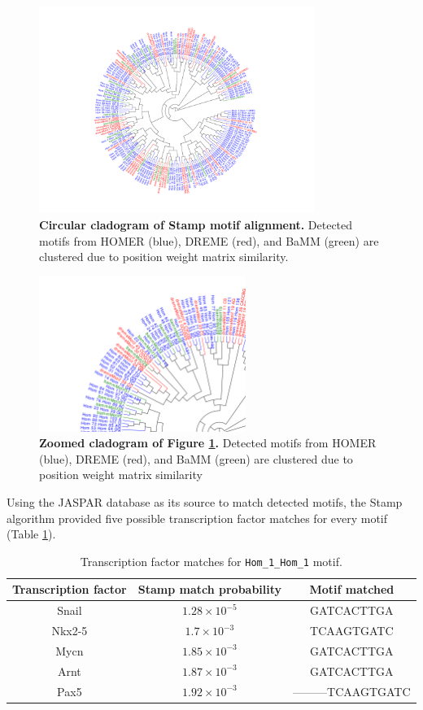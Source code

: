 \documentclass[12pt]{article}
\begin{document}
\begin{figure}[!htbp]
\centering
\includegraphics[width= 0.8\textwidth]{stampTree.pdf} 
\caption{{\bf Circular cladogram of Stamp motif alignment.} Detected motifs from HOMER (blue),  DREME (red), and BaMM (green) are clustered due to position weight matrix similarity. }
\label{mainStampTree}
\end{figure}

\begin{figure}[!htbp]
\centering
\includegraphics[width= 0.6\textwidth]{stampTreeDetail.pdf} 
\caption{{\bf Zoomed cladogram of Figure \ref{mainStampTree}.} Detected motifs from HOMER (blue),  DREME (red), and BaMM (green) are clustered due to position weight matrix similarity}
\label{treeDetail}
\end{figure}

Using the JASPAR database  \citep{Mathelier2016} as its source to match detected motifs, the Stamp algorithm provided five possible transcription factor matches for every motif (Table \ref{5tfs}). 

\begin{table}[!htbp]
\caption{Transcription factor matches for \texttt{Hom\_1\_Hom\_1} motif.}
\label{5tfs}
\centering
\begin{tabular}{ccc}
\toprule[0.2em]
Transcription factor & Stamp match probability & Motif matched \\
\midrule[0.1em]
Snail & $1.28\times10^{-5}$ & GATCACTTGA\\
Nkx2-5 & $1.7\times10^{-3}$ & TCAAGTGATC\\
Mycn & $1.85\times10^{-3}$ & GATCACTTGA\\
Arnt & $1.87\times10^{-3}$ & GATCACTTGA\\
Pax5 & $1.92\times10^{-3}$ & ---------TCAAGTGATC\\
\bottomrule[0.2em]
\end{tabular}
\end{table}
\end{document}
